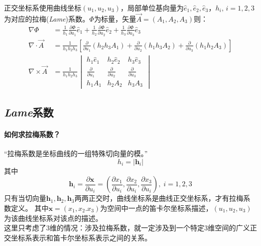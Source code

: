     正交坐标系使用曲线坐标$(u_1,u_2,u_3)$，局部单位基向量为$\hat{e}_1,\hat{e}_2,\hat{e}_3$，$h_i,\,i=1,2,3$为对应的拉梅(\emph{Lame})系数。$\varPhi$为标量，矢量$\vec{A}=(A_1,A_2,A_3)$则：
    \begin{subequations}
        \begin{align}
            \nabla \varPhi&=\frac{1}{h_1}\frac{\partial \varPhi}{\partial u_1}\hat{e}_1+\frac{1}{h_2}\frac{\partial \varPhi}{\partial u_2}\hat{e}_2+\frac{1}{h_3}\frac{\partial \varPhi}{\partial u_3}\hat{e}_3\\
            \nabla\cdot\vec{A}&=\frac{1}{h_1h_2h_3}\left[\frac{\partial }{\partial u_1}(h_2h_3A_1)+\frac{\partial }{\partial u_2}(h_1h_3A_2)+\frac{\partial }{\partial u_3}(h_1h_2A_3)\right]\\
            \nabla\times\vec{A}&=\frac{1}{h_1h_2h_3}\begin{vmatrix}
            h_1\hat{e}_1&h_2\hat{e}_2&h_3 \hat{e}_3\\
            \frac{\partial }{\partial u_1}&\frac{\partial }{\partial u_2}&\frac{\partial }{\partial u_3}\\
            h_1A_1&h_2A_2&h_3 A_3
        \end{vmatrix}
        \end{align}
    \end{subequations}

    \subsection{\emph{Lame}系数}
    \paragraph{如何求拉梅系数？}
    “拉梅系数是坐标曲线的一组特殊切向量的模。”
    \begin{equation}
        h_i=|\bm{h}_i|
    \end{equation}
    其中
    \begin{equation}
        \bm{h}_i=\frac{\partial \bm{x}}{\partial u_i}=\left(\frac{\partial x_1}{\partial u_i},\frac{\partial x_2}{\partial u_i},\frac{\partial x_3}{\partial u_i}\right),\;i=1,2,3
    \end{equation}
    只有当切向量$\bm{h}_1,\bm{h}_2,\bm{h}_3$两两正交时，曲线坐标系是曲线正交坐标系，才有拉梅系数定义。
    其中$\bm{x}=(x_1,x_2.x_3)$为空间中一点的笛卡尔坐标系描述，$(u_1,u_2,u_3)$为该曲线坐标系对该点的描述。\\
    这里只考虑了3维的情况：涉及拉梅系数，就一定涉及到一个特定3维空间的广义正交坐标系表示和笛卡尔坐标系表示之间的关系。

